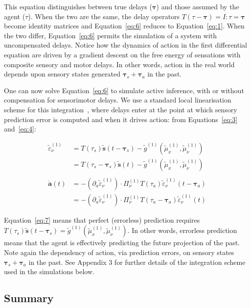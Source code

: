 \documentclass[a4paper]{article} %
\begin{document}
This equation distinguishes between true delays ($\bm{\tau}$) and those assumed by the agent ($\tau$). 
When the two are the same, the delay operators  $T(\tau-\bm{\tau})=I: \tau=\bm{\tau}$ 
become identity matrices and Equation~\ref{eq:6} reduces to Equation~\ref{eq:1}. When
the two differ, Equation~\ref{eq:6} permits the simulation of a system with
uncompensated delays. Notice how the dynamics of action in the first
differential equation are driven by a gradient descent on the free
energy of sensations with composite sensory and motor delays. In other
words, action in the real world depends upon sensory states generated
$\bm{\tau}_s+\bm{\tau}_a$ in the past.

One can now solve Equation~\ref{eq:6} to simulate active inference, with or
without compensation for sensorimotor delays. We use a standard local
linearisation scheme for this integration~\citep{Ozaki92}, where delays
enter at the point at which sensory prediction error is computed and
when it drives action: from Equations~\ref{eq:3} and~\ref{eq:4}:

\begin{align}
\tilde{\varepsilon}^{(1)}_\nu &= T(\tau_s)  \bm{\tilde{s}}(t-\bm{\tau}_s) - \tilde{g}^{(1)}(\tilde{\mu}^{(1)}_x, \tilde{\mu}^{(1)}_\nu)  \nonumber \\%
                              &= T(\tau_s-\bm{\tau}_s)  \bm{\tilde{s}}(t) - \tilde{g}^{(1)}(\tilde{\mu}^{(1)}_x, \tilde{\mu}^{(1)}_\nu) \nonumber  \\%
\label{eq:7} \\%
\bm{\dot{a}}(t) &= -(\partial_a \tilde{\varepsilon}^{(1)}_\nu) \cdot \Pi^{(1)}_\nu T(\tau_a)  \tilde{\varepsilon}^{(1)}_\nu (t-\bm{\tau}_a) \nonumber  \\%
                &= -(\partial_a \tilde{\varepsilon}^{(1)}_\nu) \cdot \Pi^{(1)}_\nu T(\tau_a-\bm{\tau}_a)  \tilde{\varepsilon}^{(1)}_\nu (t) \nonumber  %
\end{align}%

Equation~\ref{eq:7} means that perfect (errorless) prediction requires
$T(\tau_s)  \bm{\tilde{s}}(t-\bm{\tau}_s) = \tilde{g}^{(1)}(\tilde{\mu}^{(1)}_x, \tilde{\mu}^{(1)}_\nu)$. In other words, errorless prediction means that the agent is effectively
predicting the future projection of the past. Note again the dependency
of action, via prediction errors, on sensory states
$\bm{\tau}_s+\bm{\tau}_a$ in the past. See Appendix 3 for further details of the integration scheme used in the simulations below.

\subsection{Summary}
\end{document}
